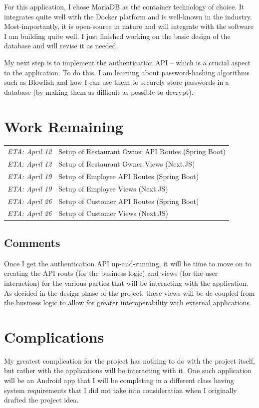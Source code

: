\documentclass[letterpaper,11pt]{../../templates/texMemo}
\begin{document}
    For this application, I chose MariaDB as the container technology of choice. It integrates quite well with the Docker platform and is well-known in the industry. Most-importantly, it is open-source in nature and will integrate with the software I am building quite well. I just finished working on the basic design of the database and will revise it as needed.

    My next step is to implement the authentication API -- which is a crucial aspect to the application. To do this, I am learning about password-hashing algorithms such as Blowfish and how I can use them to securely store passwords in a database (by making them as difficult as possible to decrypt).


    \section{Work Remaining}
    \begin{tabular}{|r l|}
        \hline
        \emph{ETA: April 12} & Setup of Restaurant Owner API Routes (Spring Boot) \\
        \emph{ETA: April 12} & Setup of Restaurant Owner Views (Next.JS)          \\
        \hline
        \emph{ETA: April 19} & Setup of Employee API Routes (Spring Boot)         \\
        \emph{ETA: April 19} & Setup of Employee Views (Next.JS)                  \\
        \hline
        \emph{ETA: April 26} & Setup of Customer API Routes (Spring Boot)         \\
        \emph{ETA: April 26} & Setup of Customer Views (Next.JS)                  \\
        \hline
    \end{tabular}

    \subsection{Comments}
    Once I get the authentication API up-and-running, it will be time to move on to creating the API routs (for the business logic) and views (for the user interaction) for the various parties that will be interacting with the application. As decided in the design phase of the project, these views will be de-coupled from the business logic to allow for greater interoperability with external applications.


    \section{Complications}
    My greatest complication for the project has nothing to do with the project itself, but rather with the applications will be interacting with it. One such application will be an Android app that I will be completing in a different class having system requirements that I did not take into consideration when I originally drafted the project idea.
\end{document}
